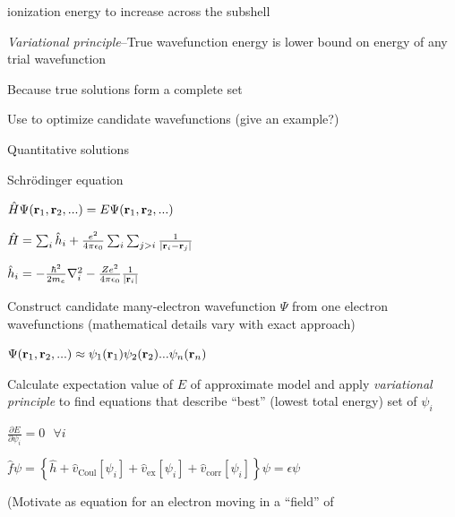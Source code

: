 \documentclass[11pt]{article}
\begin{document}
\begin{outline}
\begin{outline}
\begin{outline}
\begin{outline}
        ionization energy to increase across the subshell
      \end{outline}
    \end{outline}
  \item {\em Variational principle}--True wavefunction energy is lower bound on
    energy of any trial wavefunction
    \begin{outline}
      \item Because true solutions form a complete set
      \item Use to optimize candidate wavefunctions (give an example?)
    \end{outline}
  \item Quantitative solutions
    \begin{outline}
    \item Schr\"odinger equation
     \begin{outline}
     \item $\hat H \Psi({\bf r}_1, {\bf r}_2,...)=E \Psi({\bf r}_1, {\bf r}_2,...)$
     \item $\hat H = \sum_i \hat h_i + \frac{e^2}{4 \pi
         \epsilon_0}\sum_i\sum_{j>i}\frac{1}{|{\bf r}_i-{\bf r}_j|}$
     \item $\hat h_i = -\frac{\hbar^2}{2m_e}\nabla^2_i-\frac{Z
         e^2}{4\pi\epsilon_0}\frac{1}{|{\bf r}_i|}$
     \end{outline}
   \item Construct candidate many-electron wavefunction $\Psi$ from one
     electron wavefunctions (mathematical details vary with exact approach)
       \begin{outline}
       \item $\Psi({\bf r}_1, {\bf r}_2,...)\approx \psi_1({\bf
           r}_1)\psi_2({\bf r}_2)...\psi_n({\bf r}_n)$
       \end{outline}
     \item Calculate expectation value of $E$ of approximate model and apply
      {\em  variational principle} to find equations that describe ``best'' (lowest
       total energy) set of $\psi_i$
       \begin{outline}
       \item $\frac{\partial E}{\partial \psi_i}=0 \ \ \ \forall i$
       \item $\hat f\psi=\left\{\hat h + \hat v_\mathrm{Coul}[\psi_i] + \hat
           v_\mathrm{ex}[\psi_i]+\hat v_\mathrm{corr}[\psi_i] \right\}\psi=\epsilon\psi$
       \item (Motivate as equation for an electron moving in a ``field'' of

\end{outline}
\end{outline}
\end{outline}
\end{outline}
\end{document}
